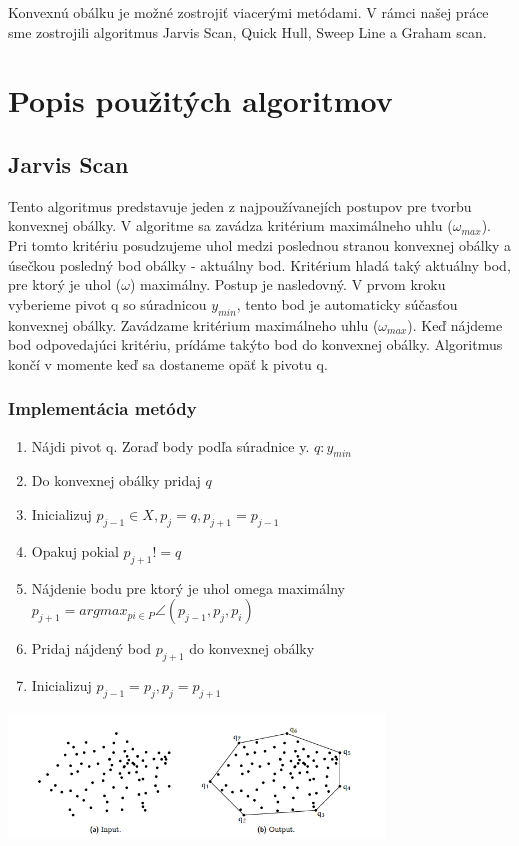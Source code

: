 \documentclass[12pt]{article}
\begin{document}
Konvexnú obálku je možné zostrojiť viacerými metódami. V rámci našej práce sme zostrojili algoritmus Jarvis Scan, Quick Hull, Sweep Line a Graham scan.


\section {Popis použitých algoritmov}
\subsection {Jarvis Scan}
Tento algoritmus predstavuje jeden z najpoužívanejích postupov pre tvorbu konvexnej obálky. V algoritme sa zavádza kritérium maximálneho uhlu ($\omega_{max}$). Pri tomto kritériu posudzujeme uhol medzi poslednou stranou konvexnej obálky a úsečkou posledný bod obálky - aktuálny bod. Kritérium hladá taký aktuálny bod, pre ktorý je uhol ($\omega$) maximálny. 
Postup je nasledovný. V prvom kroku vyberieme pivot q so súradnicou $y_{min}$, tento bod je automaticky súčasťou konvexnej obálky. Zavádzame kritérium maximálneho uhlu ($\omega_{max}$). Keď nájdeme bod odpovedajúci kritériu, prídáme takýto bod do konvexnej obálky. Algoritmus končí v momente keď sa dostaneme opäť k pivotu q. 

\subsubsection {Implementácia metódy}
\begin{enumerate}
\item Nájdi pivot q. Zoraď body podľa súradnice y. $ q : y_{min}$
\item Do konvexnej obálky pridaj $q$
\item Inicializuj  $p_{j-1} \in X, p_j = q, p_{j+1} = p_{j-1}$
\item Opakuj pokial $p_{j+1} != q$
\item \hspace {1.5cm} Nájdenie bodu pre ktorý je uhol omega maximálny $p_{j+1} = argmax_{pi \in P} \angle(p_{j-1}, p_j, p_i)$
\item \hspace {1.5cm} Pridaj nájdený bod  $p_{j+1}$ do konvexnej obálky
\item \hspace {1.5cm} Inicializuj $p_{j-1} = p_j , p_j = p_{j+1}$ 
\end{enumerate}

\begin{center}
   \includegraphics[width=10cm]{./img/ch_obrazok1.png}
\end{center}
\end{document}

